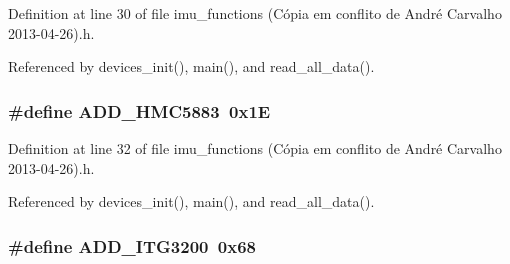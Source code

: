 Definition at line 30 of file imu\-\_\-functions (\-Cópia em conflito de André Carvalho 2013-\/04-\/26).\-h.



Referenced by devices\-\_\-init(), main(), and read\-\_\-all\-\_\-data().

\hypertarget{imu__functions_01_07C_xC3_xB3pia_01em_01conflito_01de_01Andr_xC3_xA9_01Carvalho_012013-04-26_08_8h_a383c09d3e3bbe30097f7eb8d081fb856}{
\subsubsection[{A\-D\-D\-\_\-\-H\-M\-C5883}]{\setlength{\rightskip}{0pt plus 5cm}\#define A\-D\-D\-\_\-\-H\-M\-C5883~0x1\-E}}\label{imu__functions_01_07C_xC3_xB3pia_01em_01conflito_01de_01Andr_xC3_xA9_01Carvalho_012013-04-26_08_8h_a383c09d3e3bbe30097f7eb8d081fb856}


Definition at line 32 of file imu\-\_\-functions (\-Cópia em conflito de André Carvalho 2013-\/04-\/26).\-h.



Referenced by devices\-\_\-init(), main(), and read\-\_\-all\-\_\-data().

\hypertarget{imu__functions_01_07C_xC3_xB3pia_01em_01conflito_01de_01Andr_xC3_xA9_01Carvalho_012013-04-26_08_8h_ab9fd1068a3f5fcba24d92918aaf0dcb5}{
\subsubsection[{A\-D\-D\-\_\-\-I\-T\-G3200}]{\setlength{\rightskip}{0pt plus 5cm}\#define A\-D\-D\-\_\-\-I\-T\-G3200~0x68}}\label{imu__functions_01_07C_xC3_xB3pia_01em_01conflito_01de_01Andr_xC3_xA9_01Carvalho_012013-04-26_08_8h_ab9fd1068a3f5fcba24d92918aaf0dcb5}


